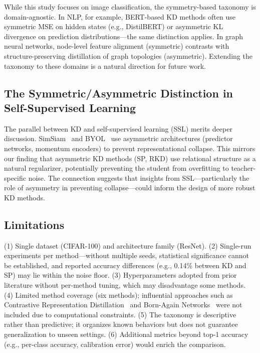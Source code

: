 \documentclass[symmetry,article,submit,pdftex,moreauthors]{Definitions/mdpi}
\begin{document}
While this study focuses on image classification, the symmetry-based taxonomy is domain-agnostic. In NLP, for example, BERT-based KD methods often use symmetric MSE on hidden states (e.g., DistilBERT) or asymmetric KL divergence on prediction distributions---the same distinction applies. In graph neural networks, node-level feature alignment (symmetric) contrasts with structure-preserving distillation of graph topologies (asymmetric). Extending the taxonomy to these domains is a natural direction for future work.

\subsection{The Symmetric/Asymmetric Distinction in Self-Supervised Learning}

The parallel between KD and self-supervised learning (SSL) merits deeper discussion. SimSiam~\cite{ref16} and BYOL~\cite{ref17} use asymmetric architectures (predictor networks, momentum encoders) to prevent representational collapse. This mirrors our finding that asymmetric KD methods (SP, RKD) use relational structure as a natural regularizer, potentially preventing the student from overfitting to teacher-specific noise. The connection suggests that insights from SSL---particularly the role of asymmetry in preventing collapse---could inform the design of more robust KD methods.

\subsection{Limitations}

(1) Single dataset (CIFAR-100) and architecture family (ResNet). (2) Single-run experiments per method---without multiple seeds, statistical significance cannot be established, and reported accuracy differences (e.g., 0.14\% between KD and SP) may lie within the noise floor. (3) Hyperparameters adopted from prior literature without per-method tuning, which may disadvantage some methods. (4) Limited method coverage (six methods); influential approaches such as Contrastive Representation Distillation~\cite{ref18} and Born-Again Networks~\cite{ref22} were not included due to computational constraints. (5) The taxonomy is descriptive rather than predictive; it organizes known behaviors but does not guarantee generalization to unseen settings. (6) Additional metrics beyond top-1 accuracy (e.g., per-class accuracy, calibration error) would enrich the comparison.
\end{document}
